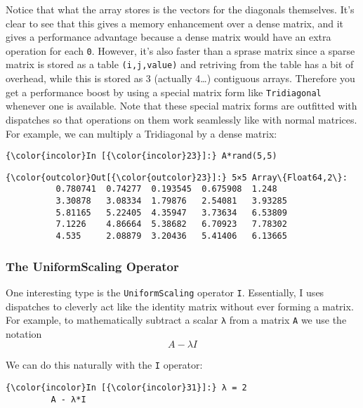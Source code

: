 \documentclass[11pt]{article}
\begin{document}
    Notice that what the array stores is the vectors for the diagonals
themselves. It's clear to see that this gives a memory enhancement over
a dense matrix, and it gives a performance advantage because a dense
matrix would have an extra operation for each \texttt{0}. However, it's
also faster than a sprase matrix since a sparse matrix is stored as a
table \texttt{(i,j,value)} and retriving from the table has a bit of
overhead, while this is stored as 3 (actually 4\ldots{}) contiguous
arrays. Therefore you get a performance boost by using a special matrix
form like \texttt{Tridiagonal} whenever one is available. Note that
these special matrix forms are outfitted with dispatches so that
operations on them work seamlessly like with normal matrices. For
example, we can multiply a Tridiagonal by a dense matrix:

    \begin{Verbatim}[commandchars=\\\{\}]
{\color{incolor}In [{\color{incolor}23}]:} A*rand(5,5)
\end{Verbatim}

            \begin{Verbatim}[commandchars=\\\{\}]
{\color{outcolor}Out[{\color{outcolor}23}]:} 5×5 Array\{Float64,2\}:
          0.780741  0.74277  0.193545  0.675908  1.248  
          3.30878   3.08334  1.79876   2.54081   3.93285
          5.81165   5.22405  4.35947   3.73634   6.53809
          7.1226    4.86664  5.38682   6.70923   7.78302
          4.535     2.08879  3.20436   5.41406   6.13665
\end{Verbatim}
        
    \subsubsection{The UniformScaling
Operator}\label{the-uniformscaling-operator}

One interesting type is the \texttt{UniformScaling} operator \texttt{I}.
Essentially, I uses dispatches to cleverly act like the identity matrix
without ever forming a matrix. For example, to mathematically subtract a
scalar \texttt{λ} from a matrix \texttt{A} we use the notation
\[ A - \lambda I\]

We can do this naturally with the \texttt{I} operator:

    \begin{Verbatim}[commandchars=\\\{\}]
{\color{incolor}In [{\color{incolor}31}]:} λ = 2
         A - λ*I
\end{Verbatim}
\end{document}
